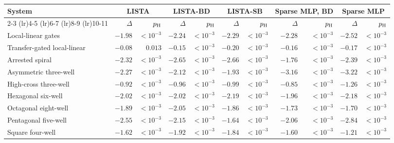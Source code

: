 \begin{tabular}{@{}l rr rr rr rr rr@{}}
\toprule
System & \multicolumn{2}{c}{LISTA} & \multicolumn{2}{c}{LISTA-BD} & \multicolumn{2}{c}{LISTA-SB} & \multicolumn{2}{c}{Sparse MLP, BD} & \multicolumn{2}{c}{Sparse MLP} \\
\cmidrule(lr){2-3} \cmidrule(lr){4-5} \cmidrule(lr){6-7} \cmidrule(lr){8-9} \cmidrule(lr){10-11}
 & $\Delta$ & $p_{\rm H}$ & $\Delta$ & $p_{\rm H}$ & $\Delta$ & $p_{\rm H}$ & $\Delta$ & $p_{\rm H}$ & $\Delta$ & $p_{\rm H}$ \\
\midrule
Local-linear gates & $\mathbf{-1.98}$ & $<\!10^{-3}$ & $\mathbf{-2.24}$ & $<\!10^{-3}$ & $\mathbf{-2.29}$ & $<\!10^{-3}$ & $\mathbf{-2.28}$ & $<\!10^{-3}$ & $\mathbf{-2.52}$ & $<\!10^{-3}$ \\
Transfer-gated local-linear & $\mathbf{-0.08}$ & $0.013$ & $\mathbf{-0.15}$ & $<\!10^{-3}$ & $\mathbf{-0.20}$ & $<\!10^{-3}$ & $\mathbf{-0.16}$ & $<\!10^{-3}$ & $\mathbf{-0.17}$ & $<\!10^{-3}$ \\
Arrested spiral & $\mathbf{-2.32}$ & $<\!10^{-3}$ & $\mathbf{-2.65}$ & $<\!10^{-3}$ & $\mathbf{-2.66}$ & $<\!10^{-3}$ & $\mathbf{-1.76}$ & $<\!10^{-3}$ & $\mathbf{-2.39}$ & $<\!10^{-3}$ \\
Asymmetric three-well & $\mathbf{-2.27}$ & $<\!10^{-3}$ & $\mathbf{-2.12}$ & $<\!10^{-3}$ & $\mathbf{-1.93}$ & $<\!10^{-3}$ & $\mathbf{-3.16}$ & $<\!10^{-3}$ & $\mathbf{-3.22}$ & $<\!10^{-3}$ \\
High-cross three-well & $\mathbf{-0.92}$ & $<\!10^{-3}$ & $\mathbf{-0.96}$ & $<\!10^{-3}$ & $\mathbf{-0.99}$ & $<\!10^{-3}$ & $\mathbf{-0.85}$ & $<\!10^{-3}$ & $\mathbf{-1.26}$ & $<\!10^{-3}$ \\
Hexagonal six-well & $\mathbf{-2.02}$ & $<\!10^{-3}$ & $\mathbf{-2.02}$ & $<\!10^{-3}$ & $\mathbf{-2.19}$ & $<\!10^{-3}$ & $\mathbf{-1.96}$ & $<\!10^{-3}$ & $\mathbf{-2.18}$ & $<\!10^{-3}$ \\
Octagonal eight-well & $\mathbf{-1.89}$ & $<\!10^{-3}$ & $\mathbf{-2.05}$ & $<\!10^{-3}$ & $\mathbf{-1.86}$ & $<\!10^{-3}$ & $\mathbf{-1.73}$ & $<\!10^{-3}$ & $\mathbf{-1.70}$ & $<\!10^{-3}$ \\
Pentagonal five-well & $\mathbf{-2.55}$ & $<\!10^{-3}$ & $\mathbf{-2.15}$ & $<\!10^{-3}$ & $\mathbf{-1.64}$ & $<\!10^{-3}$ & $\mathbf{-2.06}$ & $<\!10^{-3}$ & $\mathbf{-2.84}$ & $<\!10^{-3}$ \\
Square four-well & $\mathbf{-1.62}$ & $<\!10^{-3}$ & $\mathbf{-1.92}$ & $<\!10^{-3}$ & $\mathbf{-1.84}$ & $<\!10^{-3}$ & $\mathbf{-1.60}$ & $<\!10^{-3}$ & $\mathbf{-1.21}$ & $<\!10^{-3}$ \\

\end{tabular}
